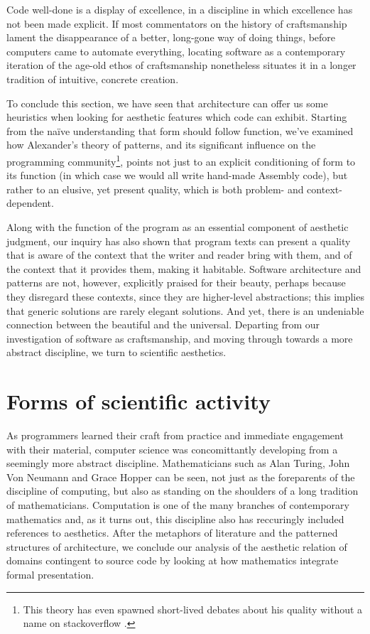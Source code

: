 Code well-done is a display of excellence, in a discipline in which excellence has not been made explicit. If most commentators on the history of craftsmanship lament the disappearance of a better, long-gone way of doing things, before computers came to automate everything, locating software as a contemporary iteration of the age-old ethos of craftsmanship nonetheless situates it in a longer tradition of intuitive, concrete creation.

\spacersmall

To conclude this section, we have seen that architecture can offer us some heuristics when looking for aesthetic features which code can exhibit. Starting from the naïve understanding that form should follow function, we've examined how Alexander's theory of patterns, and its significant influence on the programming community\footnote{This theory has even spawned short-lived debates about his quality without a name on stackoverflow \citep{interstar_quality_2017}.}, points not just to an explicit conditioning of form to its function (in which case we would all write hand-made Assembly code), but rather to an elusive, yet present quality, which is both problem- and context-dependent.

Along with the function of the program as an essential component of aesthetic judgment, our inquiry has also shown that program texts can present a quality that is aware of the context that the writer and reader bring with them, and of the context that it provides them, making it habitable. Software architecture and patterns are not, however, explicitly praised for their beauty, perhaps because they disregard these contexts, since they are higher-level abstractions; this implies that generic solutions are rarely elegant solutions. And yet, there is an undeniable connection between the beautiful and the universal. Departing from our investigation of software as craftsmanship, and moving through towards a more abstract discipline, we turn to scientific aesthetics.

\section{Forms of scientific activity}
\label{sec:aesthetic-scientific}

As programmers learned their craft from practice and immediate engagement with their material, computer science was concomittantly developing from a seemingly more abstract discipline. Mathematicians such as Alan Turing, John Von Neumann and Grace Hopper can be seen, not just as the foreparents of the discipline of computing, but also as standing on the shoulders of a long tradition of mathematicians. Computation is one of the many branches of contemporary mathematics and, as it turns out, this discipline also has reccuringly included references to aesthetics. After the metaphors of literature and the patterned structures of architecture, we conclude our analysis of the aesthetic relation of domains contingent to source code by looking at how mathematics integrate formal presentation.

